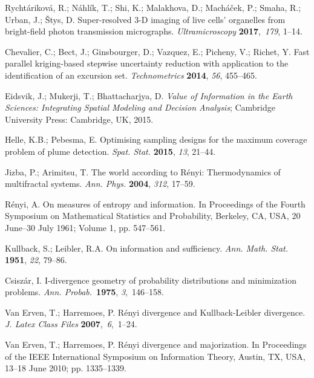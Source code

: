 \documentclass[entropy,article,accept,moreauthors,pdftex,10pt,a4paper]{mdpi}
\begin{document}
\begin{thebibliography}{00}
 Rycht\'{a}rikov\'{a}, R.; N\'{a}hl\'{i}k, T.; Shi, K.; Malakhova, D.; Mach\'{a}\v{c}ek, P.; Smaha, R.; Urban, J.; \v{S}tys, D. Super-resolved 3-D imaging of live cells’ organelles from bright-field photon transmission micrographs. \textit{Ultramicroscopy} \textbf{2017},~\textit{179}, 1--14.

 Chevalier, C.; Bect, J.; Ginsbourger, D.; Vazquez, E.; Picheny, V.; Richet, Y.  Fast parallel kriging-based stepwise uncertainty reduction with application to the identification of an excursion set. \textit{Technometrics} \textbf{2014}, \emph{56}, 455--465.

 Eidsvik, J.; Mukerji, T.; Bhattacharjya, D. \emph{Value of Information in the Earth Sciences: Integrating Spatial Modeling and Decision Analysis}; Cambridge University Press: Cambridge, UK, 2015.

 Helle, K.B.; Pebesma, E. Optimising sampling designs for the maximum coverage problem of plume detection. \emph{Spat. Stat.} \textbf{2015}, \emph{13}, 21--44.%

 {Jizba, P.; Arimitsu, T. The world according to R\'{e}nyi: Thermodynamics of multifractal systems.} {\textit{Ann. Phys.}  \textbf{2004}, \textit{312}, 17--59.}%

 R\'{e}nyi, A. On measures of entropy and information. In Proceedings of the Fourth Symposium on Mathematical Statistics and Probability, Berkeley, CA, USA, 20 June--30 July 1961; Volume 1, pp. 547--561.

 Kullback, S.; Leibler, R.A. On information and sufficiency. \textit{Ann. Math. Stat.} \textbf{1951}, \textit{22}, 79--86.

 Csisz\'{a}r, I. I-divergence geometry of probability distributions and minimization problems. \textit{Ann. Probab.}~\textbf{1975}, \textit{3},~146--158.

 

 Van Erven, T.; Harremoes, P. R\'{e}nyi divergence and Kullback-Leibler divergence. \textit{J. Latex Class Files} \textbf{2007},~\textit{6},~1--24.

 Van Erven, T.; Harremoes, P. R\'{e}nyi divergence and majorization. In Proceedings of the  IEEE International Symposium on  Information Theory, Austin, TX, USA, 13--18 June 2010; pp. 1335--1339.


\end{thebibliography}
\end{document}
